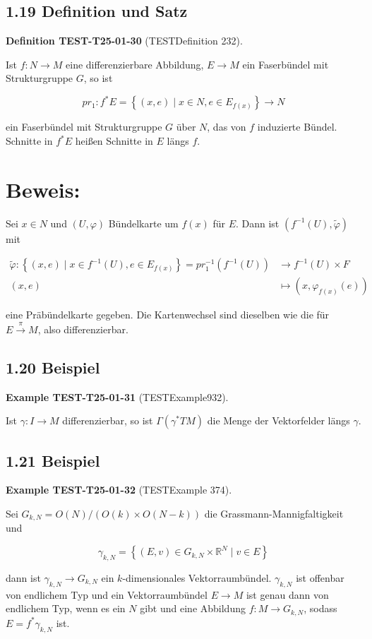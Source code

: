 \documentclass[10pt, letterpaper]{article}
\newcommand{\CustomHeading}[3]{%
  \par\medskip\noindent%
  \textbf{#1 #2} \textnormal{(#3)}.\enskip%
}
\newenvironment{DEF}[2]{\begin{unitbox}\CustomHeading{Definition}{#1}{#2}}{\end{unitbox}}
\newenvironment{EXA}[2]{\begin{unitbox}\CustomHeading{Example}{#1}{#2}}{\end{unitbox}}
\begin{document}
\subsection*{1.19 Definition und Satz}
\begin{DEF}{TEST-T25-01-30}{TESTDefinition 232}
Ist $f: N \rightarrow M$ eine differenzierbare Abbildung, $E \rightarrow M$ ein Faserbündel mit Strukturgruppe $G$, so ist

$$
p r_{1}: f^{*} E=\left\{(x, e) \mid x \in N, e \in E_{f(x)}\right\} \rightarrow N
$$

ein Faserbündel mit Strukturgruppe $G$ über $N$, das von $f$ induzierte Bündel. Schnitte in $f^{*} E$ heißen Schnitte in $E$ längs $f$.
\end{DEF}

\section*{Beweis:}
Sei $x \in N$ und $(U, \varphi)$ Bündelkarte um $f(x)$ für $E$. Dann ist $\left(f^{-1}(U), \tilde{\varphi}\right)$ mit

$$
\begin{aligned}
\tilde{\varphi}:\left\{(x, e) \mid x \in f^{-1}(U), e \in E_{f(x)}\right\}=p r_{1}^{-1}\left(f^{-1}(U)\right) & \longrightarrow f^{-1}(U) \times F \\
(x, e) & \mapsto\left(x, \varphi_{f(x)}(e)\right)
\end{aligned}
$$

eine Präbündelkarte gegeben. Die Kartenwechsel sind dieselben wie die für $E \xrightarrow{\pi} M$, also differenzierbar.

\subsection*{1.20 Beispiel}
\begin{EXA}{TEST-T25-01-31}{TESTExample932}
Ist $\gamma: I \rightarrow M$ differenzierbar, so ist $\Gamma\left(\gamma^{*} T M\right)$ die Menge der Vektorfelder längs $\gamma$.
\end{EXA}

\subsection*{1.21 Beispiel}
\begin{EXA}{TEST-T25-01-32}{TESTExample 374}
Sei $G_{k, N}=O(N) /(O(k) \times O(N-k))$ die Grassmann-Mannigfaltigkeit und

$$
\gamma_{k, N}=\left\{(E, v) \in G_{k, N} \times \mathbb{R}^{N} \mid v \in E\right\}
$$

dann ist $\gamma_{k, N} \rightarrow G_{k, N}$ ein $k$-dimensionales Vektorraumbündel. $\gamma_{k, N}$ ist offenbar von endlichem Typ und ein Vektorraumbündel $E \rightarrow M$ ist genau dann von endlichem Typ, wenn es ein $N$ gibt und eine Abbildung $f: M \rightarrow G_{k, N}$, sodass $E=f^{*} \gamma_{k, N}$ ist.
\end{EXA}
\end{document}

